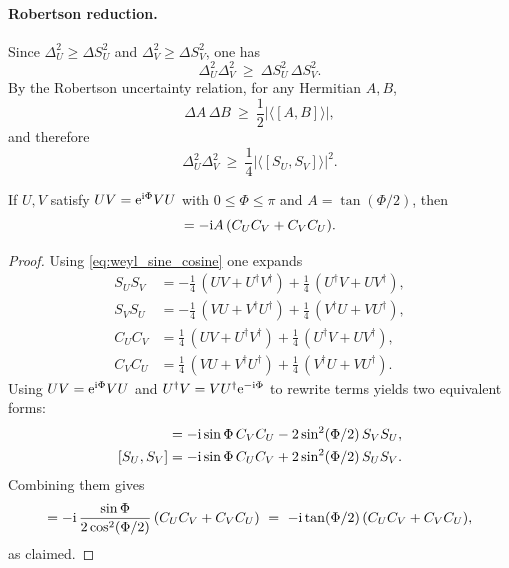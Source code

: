 \paragraph{Robertson reduction.}
Since $\Delta_U^2\ge \Delta S_U^2$ and $\Delta_V^2\ge \Delta S_V^2$, one has
\begin{equation}
\Delta_U^2\Delta_V^2\ \ge\ \Delta S_U^2\,\Delta S_V^2.
\end{equation}
By the Robertson uncertainty relation, for any Hermitian $A,B$,
\begin{equation}
\Delta A\,\Delta B\ \ge\ \frac12\bigl|\langle[A,B]\rangle\bigr|,
\end{equation}
and therefore
\begin{equation}
\Delta_U^2\Delta_V^2\ \ge\ \frac14\bigl|\langle[S_U,S_V]\rangle\bigr|^2.
\label{eq:weyl_robertson_step}
\end{equation}

\begin{lemma}
\label{lem:weyl_sine_commutator}
If $U,V$ satisfy $UV=\mathrm{e}^{\mathrm{i}\Phi}VU$ with $0\le\Phi\le\pi$ and $A=\tan(\Phi/2)$, then
\begin{equation}
[S_U,S_V]=-\iu A\,(C_UC_V+C_VC_U).
\label{eq:weyl_sine_commutator}
\end{equation}
\end{lemma}

\begin{proof}
Using \eqref{eq:weyl_sine_cosine} one expands
\begin{align}
S_U S_V
&=-\frac14\,(UV+U^{\dagger}V^{\dagger})+\frac14\,(U^{\dagger}V+UV^{\dagger}),\\
S_V S_U
&=-\frac14\,(VU+V^{\dagger}U^{\dagger})+\frac14\,(V^{\dagger}U+VU^{\dagger}),\\
C_U C_V
&=\frac14\,(UV+U^{\dagger}V^{\dagger})+\frac14\,(U^{\dagger}V+UV^{\dagger}),\\
C_V C_U
&=\frac14\,(VU+V^{\dagger}U^{\dagger})+\frac14\,(V^{\dagger}U+VU^{\dagger}).
\end{align}
Using $UV=\mathrm{e}^{\mathrm{i}\Phi}VU$ and $U^{\dagger}V=VU^{\dagger}\mathrm{e}^{-\mathrm{i}\Phi}$ to rewrite terms yields two equivalent forms:
\begin{align}
[S_U,S_V]
&=-\iu\sin\Phi\, C_V C_U-2\sin^2(\Phi/2)\,S_VS_U,\\
[S_U,S_V]
&=-\iu\sin\Phi\, C_U C_V+2\sin^2(\Phi/2)\,S_US_V.
\end{align}
Combining them gives
\begin{equation}
[S_U,S_V]=-\iu\,\frac{\sin\Phi}{2\cos^2(\Phi/2)}\,(C_UC_V+C_VC_U)
\ =\ -\iu\tan(\Phi/2)\,(C_UC_V+C_VC_U),
\end{equation}
as claimed.
\end{proof}


